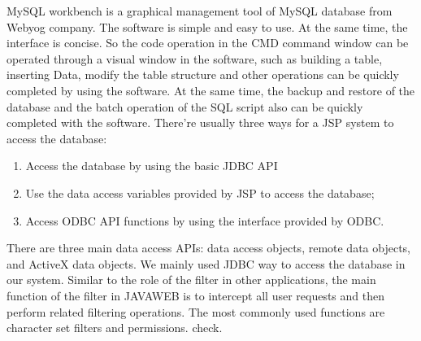 MySQL workbench is a graphical management tool of MySQL database from Webyog company. The software is simple and easy to use. At the same time, the interface is concise. So the code operation in the CMD command window can be operated through a visual window in the software, such as building a table, inserting Data, modify the table structure and other operations can be quickly completed by using the software. At the same time, the backup and restore of the database and the batch operation of the SQL script also can be quickly completed with the software.
There’re usually three ways for a JSP system to access the database:
\begin{enumerate}
    \item Access the database by using the basic JDBC API
    \item Use the data access variables provided by JSP to access the database;
    \item Access ODBC API functions by using the interface provided by ODBC.
\end{enumerate}

There are three main data access APIs: data access objects, remote data objects, and ActiveX data objects. We mainly used JDBC way to access the database in our system.
Similar to the role of the filter in other applications, the main function of the filter in JAVAWEB is to intercept all user requests and then perform related filtering operations. The most commonly used functions are character set filters and permissions. check.
